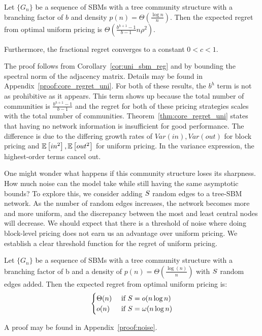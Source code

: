 \begin{theorem}\label{thm:core_regret_uni}
   Let $\{G_n\}$ be a sequence of SBMs with a tree community structure with a branching factor of $b$ and density $p(n) = \Theta( \frac{\log n}{n})$. Then the expected regret from optimal uniform pricing is $\Theta\left(\frac{b^{h+1} -1 }{b-1} n \rho^2\right)$.

    Furthermore, the fractional regret converges to a constant $0<c<1$. 
\end{theorem}

The proof follows from Corollary~\ref{cor:uni_sbm_reg} and by bounding the spectral norm of the adjacency matrix. Details may be found in Appendix~\ref{proof:core_regret_uni}. For both of these results, the $b^h$ term is not as prohibitive as it appears. This term shows up because the total number of communities is $\frac{b^{h+1} - 1}{b-1}$ and the regret for both of these pricing strategies scales with the total number of communities. Theorem~\ref{thm:core_regret_uni} states that having no network information is insufficient for good performance. The difference is due to the differing growth rates of $Var(in), Var(out)$ for block pricing and $\ex{in^2}, \ex{out^2}$ for uniform pricing. In the variance expression, the highest-order terms cancel out. 

One might wonder what happens if this community structure loses its sharpness. How much noise can the model take while still having the same asymptotic bounds? To explore this, we consider adding $\S$ random edges to a tree-SBM network. As the number of random edges increases, the network becomes more and more uniform, and the discrepancy between the most and least central nodes will decrease.  We should expect that there is a threshold of noise where doing block-level pricing does not earn us an advantage over uniform pricing. We establish a clear threshold function for the regret of uniform pricing. 


\begin{theorem}\label{thm:noise}
    Let $\{G_n\}$ be a sequence of SBMs with a tree community structure with a branching factor of b and a density of $p(n) = \Theta \left( \frac{ \log(n)}{n} \right) $ with $\S$ random edges added. Then the expected regret from optimal uniform pricing is:
    \begin{equation}
       \begin{cases} 
        \Theta(n) & \text{ if } \S = o(n \log n) \\ 
        o(n) & \text{ if } \S = \omega (n \log n)
        \end{cases}
    \end{equation}
\end{theorem}
A proof may be found in Appendix~\ref{proof:noise}. 

